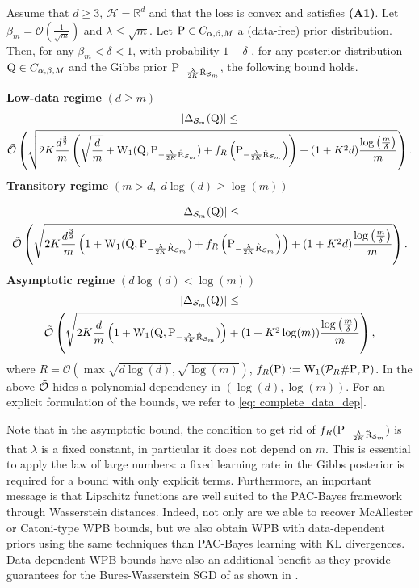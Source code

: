 \begin{theorem}
\label{th: data_dep}
Assume that $d\geq 3$, $\mathcal{H}= \mathbb{R}^d$ and that the loss is convex and satisfies \textbf{(A1)}. Let $\beta_m= \mathcal{O}(\frac{1}{\sqrt{m}})$ and $\lambda \leq \sqrt{m}$.
Let $\P\in C_{\alpha,\beta,M}$ a (data-free) prior distribution. Then, for any $\beta_m<\delta<1$, with probability $1-\delta$ , for any posterior distribution $\Q\in C_{\alpha,\beta,M}$ and the Gibbs prior $\P_{-\frac{\lambda}{2K} \Riskhat_{\Sm}}$, the following bound holds.

\noindent\textbf{Low-data regime} $(d\geq m)$
\begin{multline*}
|\Delta_{\Sm}(\Q)|  \leq \\
\Tilde{\mathcal{O}}\left( \sqrt{2K\frac{d^{\frac{3}{2}}}{m}\left(\sqrt{\frac{d}{m}}+  \W_{1}(\Q,\P_{-\frac{\lambda}{2K}\Riskhat_{\Sm}}) +f_R\left(\P_{-\frac{\lambda}{2K}\Riskhat_{\Sm}}\right)\right)+(1+K^2d)\frac{\log\left( \frac{m}{\delta} \right)}{m}}   \right).
\end{multline*}
\textbf{Transitory regime} $(m>d,\; d\log(d)\geq \log(m))$

\begin{multline*}
|\Delta_{\Sm}(\Q)|  \leq\\ 
\Tilde{\mathcal{O}}\left( \sqrt{2K\frac{d^{\frac{3}{2}}}{m}\left(1+ \W_{1}(\Q,\P_{-\frac{\lambda}{2K}\Riskhat_{\Sm}})+ f_R\left(\P_{-\frac{\lambda}{2K}\Riskhat_{\Sm}}\right)\right)+(1+K^2d)\frac{\log\left( \frac{m}{\delta} \right)}{m}}   \right).
\end{multline*}
\textbf{Asymptotic regime} $(d\log(d)< \log(m))$
\begin{multline*}
|\Delta_{\Sm}(\Q)|  \leq\\
\Tilde{\mathcal{O}}\left( \sqrt{2K\frac{d}{m}\left(1 + \W_{1}(\Q,\P_{-\frac{\lambda}{2K}\Riskhat_{\Sm}})\right)+(1+K^2\log(m))\frac{\log\left( \frac{m}{\delta} \right)}{m}}   \right),
\end{multline*}
where $R= \mathcal{O}\left( \max \sqrt{d\log(d)}, \sqrt{\log(m)}   \right)$, $f_R(\P) := \W_{1}(\mathcal{P}_{R}\#\P,\P)$.
In the above $\Tilde{\mathcal{O}}$ hides a polynomial dependency in $(\log(d),\log(m))$. For an explicit formulation of the bounds, we refer to \eqref{eq: complete_data_dep}.
\end{theorem}
Note that in the asymptotic bound, the condition to get rid of $f_R(\P_{-\frac{\lambda}{2K}\Riskhat_{\Sm}})$ is that $\lambda$ is a fixed constant, in particular it does not depend on $m$. This is essential to apply the law of large numbers: a fixed learning rate in the Gibbs posterior is required for a bound with only explicit terms.
Furthermore, an important message is that Lipschitz functions are well suited to the PAC-Bayes framework through Wasserstein distances. Indeed, not only are we able to recover McAllester or Catoni-type WPB bounds, but we also obtain WPB with data-dependent priors using the same techniques than PAC-Bayes learning with KL divergences. Data-dependent WPB bounds have also an additional benefit as they provide guarantees for the Bures-Wasserstein SGD of \citet{lambert2022variational} as shown in .

